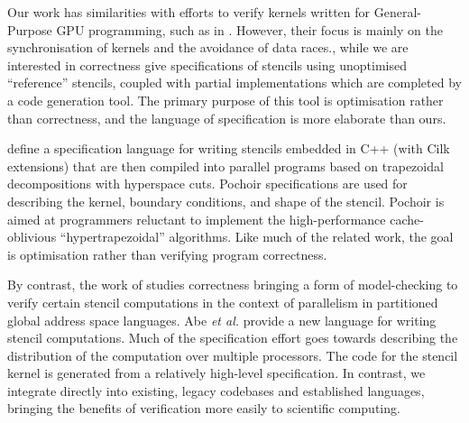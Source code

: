 Our work has similarities with efforts to verify kernels written for
General-Purpose GPU programming, such as in \citet{Blom:2014:SoCP}.
However, their focus is mainly on the synchronisation of kernels and the
avoidance of data races., while we are interested in correctness
%
\citet{Solar-Lezama:2007:PLDI} give specifications of stencils using unoptimised
``reference'' stencils, coupled with partial implementations which are completed
by a code generation tool. %
The primary purpose of this tool is optimisation rather than correctness, and
the language of specification is more elaborate than ours.

\citet{Tang:2011:SPAA} define a specification language for writing stencils
embedded in C++ (with Cilk~\citep{blumofe1996cilk} extensions) that are then
compiled into parallel programs based on trapezoidal decompositions with
hyperspace cuts. Pochoir specifications are used for describing the kernel,
boundary conditions, and shape of the stencil. Pochoir is aimed at programmers
reluctant to implement the high-performance cache-oblivious ``hypertrapezoidal''
algorithms.  Like much of the related work, the goal is optimisation rather than
verifying program correctness.

By contrast, the work of \citet{Abe:2013:IPDPSW} studies correctness bringing a
form of model-checking to verify certain stencil computations in the context of
parallelism in partitioned global address
space languages. %
Abe \emph{et al.} provide a new language for writing stencil computations. Much
of the specification effort goes towards describing the distribution of the
computation over multiple processors. The code for the stencil kernel is
generated from a relatively high-level specification.  In contrast, we integrate
directly into existing, legacy codebases and established languages, bringing
the benefits of verification more easily to scientific computing.%

